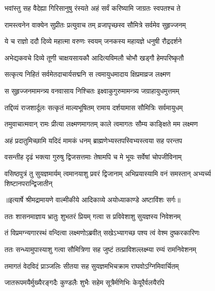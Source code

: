 \twolineshloka
{भवांस्तु सह वैदेह्या गिरिसानुषु रंस्यते}
{अहं सर्वं करिष्यामि जाग्रतः स्वपतश्च ते} %

\twolineshloka
{रामस्त्वनेन वाक्येन सुप्रीतः प्रत्युवाच तम्}
{व्रजापृच्छस्व सौमित्रे सर्वमेव सुहृज्जनम्} %

\twolineshloka
{ये च राज्ञो ददौ दिव्ये महात्मा वरुणः स्वयम्}
{जनकस्य महायज्ञे धनुषी रौद्रदर्शने} %

\twolineshloka
{अभेद्यकवचे दिव्ये तूणी चाक्षयसायकौ}
{आदित्यविमलौ चोभौ खड्गौ हेमपरिष्कृतौ} %

\twolineshloka
{सत्कृत्य निहितं सर्वमेतदाचार्यसद्मनि}
{स त्वमायुधमादाय क्षिप्रमाव्रज लक्ष्मण} %

\twolineshloka
{स सुहृज्जनमामन्त्र्य वनवासाय निश्चितः}
{इक्ष्वाकुगुरुमामन्त्र्य जग्राहायुधमुत्तमम्} %

\twolineshloka
{तद्दिव्यं राजशार्दूलः सत्कृतं माल्यभूषितम्}
{रामाय दर्शयामास सौमित्रिः सर्वमायुधम्} %

\twolineshloka
{तमुवाचात्मवान् रामः प्रीत्या लक्ष्मणमागतम्}
{काले त्वमागतः सौम्य काङ्क्षिते मम लक्ष्मण} %

\twolineshloka
{अहं प्रदातुमिच्छामि यदिदं मामकं धनम्}
{ब्राह्मणेभ्यस्तपस्विभ्यस्त्वया सह परन्तप} %

\twolineshloka
{वसन्तीह दृढं भक्त्या गुरुषु द्विजसत्तमाः}
{तेषामपि च मे भूयः सर्वेषां चोपजीविनाम्} %

\fourlineindentedshloka
{वसिष्ठपुत्रं तु सुयज्ञमार्यम्}
{त्वमानयाशु प्रवरं द्विजानाम्}
{अभिप्रयास्यामि वनं समस्तान्}
{अभ्यर्च्य शिष्टानपरान्द्विजातीन्} %


{॥इत्यार्षे श्रीमद्रामायणे वाल्मीकीये आदिकाव्ये अयोध्याकाण्डे अष्टाविंशः सर्गः॥}


\twolineshloka
{ततः शासनमाज्ञाय भ्रातुः शुभतरं प्रियम्}
{गत्वा स प्रविवेशाशु सुयज्ञस्य निवेशनम्} %

\twolineshloka
{तं विप्रमग्न्यगारस्थं वन्दित्वा लक्ष्मणोऽब्रवीत्}
{सखेऽभ्यागच्छ पश्य त्वं वेश्म दुष्करकारिणः} %

\twolineshloka
{ततः सन्ध्यामुपास्याशु गत्वा सौमित्रिणा सह}
{जुष्टं तत्प्राविशल्लक्ष्म्या रम्यं रामनिवेशनम्} %

\twolineshloka
{तमागतं वेदविदं प्राञ्जलिः सीतया सह}
{सुयज्ञमभिचक्राम राघवोऽग्निमिवार्चितम्} %

\twolineshloka
{जातरूपमयैर्मुख्यैरङ्गदैः कुण्डलैः शुभैः}
{सहेम सूत्रैर्मणिभिः केयूरैर्वलयैरपि} %

